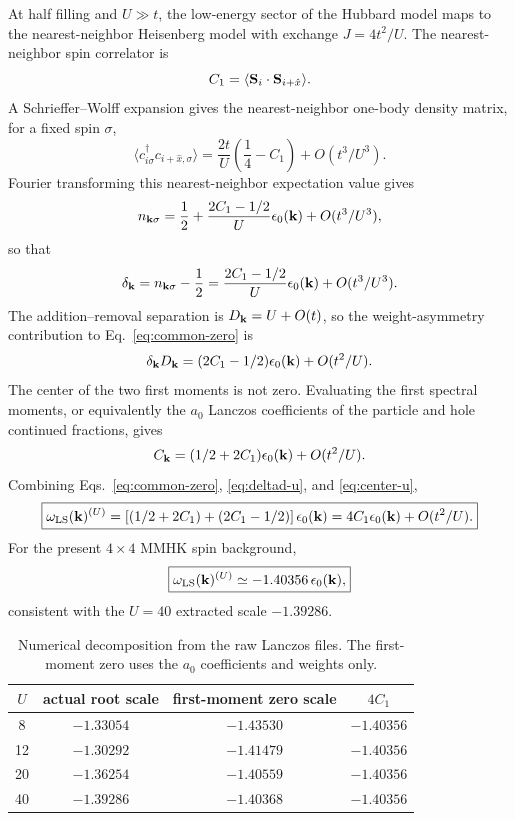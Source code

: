 \documentclass[11pt]{article}
\newcommand{\eps}{\epsilon_0({\bf k})}
\newcommand{\wls}{\omega_{\rm LS}({\bf k})}
\newcommand{\dd}{\delta_{\bf k}}
\newcommand{\Ck}{C_{\bf k}}
\newcommand{\Dk}{D_{\bf k}}
\newcommand{\Cnn}{C_1}
\begin{document}
At half filling and $U\gg t$, the low-energy sector of the Hubbard model maps to the
nearest-neighbor Heisenberg model with exchange $J=4t^2/U$.  The nearest-neighbor spin
correlator is
\begin{equation}
  \Cnn=\langle {\bf S}_i\cdot{\bf S}_{i+\hat x}\rangle.
\end{equation}
A Schrieffer--Wolff expansion gives the nearest-neighbor one-body density matrix, for a fixed
spin $\sigma$,
\begin{equation}
  \langle c^\dagger_{i\sigma}c_{i+\hat x,\sigma}\rangle
  =\frac{2t}{U}\left(\frac14-\Cnn\right)+O(t^3/U^3).
\end{equation}
Fourier transforming this nearest-neighbor expectation value gives
\begin{equation}
  n_{{\bf k}\sigma}=\frac12+\frac{2\Cnn-1/2}{U}\eps+O(t^3/U^3),
\end{equation}
so that
\begin{equation}
  \dd=n_{{\bf k}\sigma}-\frac12
  =\frac{2\Cnn-1/2}{U}\eps+O(t^3/U^3).
  \label{eq:delta-u}
\end{equation}
The addition--removal separation is $\Dk=U+O(t)$, so the weight-asymmetry contribution to
Eq.~\eqref{eq:common-zero} is
\begin{equation}
  \dd\Dk=(2\Cnn-1/2)\eps+O(t^2/U).
  \label{eq:deltad-u}
\end{equation}
The center of the two first moments is not zero.  Evaluating the first spectral moments, or
equivalently the $a_0$ Lanczos coefficients of the particle and hole continued fractions,
gives
\begin{equation}
  \Ck=(1/2+2\Cnn)\eps+O(t^2/U).
  \label{eq:center-u}
\end{equation}
Combining Eqs.~\eqref{eq:common-zero}, \eqref{eq:deltad-u}, and \eqref{eq:center-u},
\begin{equation}
  \boxed{
  \wls^{(U)}
  =\left[(1/2+2\Cnn)+(2\Cnn-1/2)\right]\eps
  =4\Cnn\eps+O(t^2/U).
  }
\end{equation}
For the present $4\times4$ MMHK spin background,
\begin{equation}
  \boxed{\wls^{(U)}\simeq -1.40356\,\eps,}
\end{equation}
consistent with the $U=40$ extracted scale $-1.39286$.

\begin{table}[h]
\centering
\caption{Numerical decomposition from the raw Lanczos files.  The first-moment zero uses the
$a_0$ coefficients and weights only.}
\begin{tabular}{cccc}
\toprule
$U$ & actual root scale & first-moment zero scale & $4\Cnn$ \\
\midrule
8  & $-1.33054$ & $-1.43530$ & $-1.40356$ \\
12 & $-1.30292$ & $-1.41479$ & $-1.40356$ \\
20 & $-1.36254$ & $-1.40559$ & $-1.40356$ \\
40 & $-1.39286$ & $-1.40368$ & $-1.40356$ \\
\bottomrule
\end{tabular}
\end{table}
\end{document}
